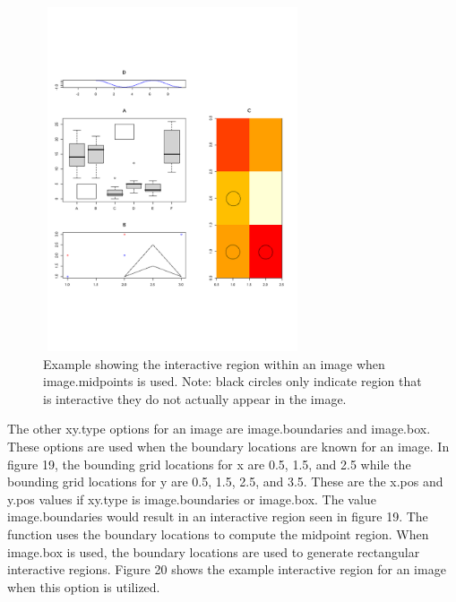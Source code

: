 \documentclass[]{article}
\begin{document}
\begin{center}
\begin{figure}
\includegraphics[width=3in, height=4in]{imageMidEx}
\caption{Example showing the interactive region within an image when image.midpoints is used. Note: black circles only indicate region that is interactive they do not actually appear in the image.}
\end{figure}
\end{center}

The other xy.type options for an image are image.boundaries and image.box. These options are used when the boundary locations are known for an image. In figure 19, the bounding grid locations for x are 0.5, 1.5, and 2.5 while the bounding grid locations for y are 0.5, 1.5, 2.5, and 3.5. These are the x.pos and y.pos values if xy.type is image.boundaries or image.box.  The value image.boundaries would result in an interactive region seen in figure 19. The function uses the boundary locations to compute the midpoint region. When image.box is used, the boundary locations are used to generate rectangular interactive regions. Figure 20 shows the example interactive region for an image when this option is utilized.     
\end{document}
